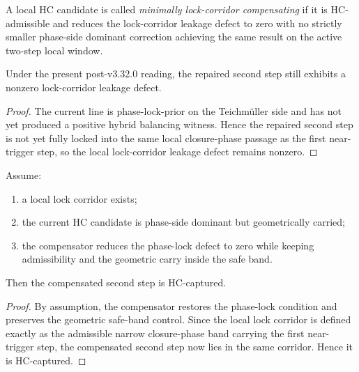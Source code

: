 \begin{definition}
\label{def:minimal-local-lock-corridor-compensation}
A local HC candidate is called \emph{minimally lock-corridor compensating} if it is HC-admissible and reduces the lock-corridor leakage defect to zero with no strictly smaller phase-side dominant correction achieving the same result on the active two-step local window.
\end{definition}

\begin{proposition}
\label{prop:current-line-still-exhibits-lock-corridor-leakage}
Under the present post-v3.32.0 reading, the repaired second step still exhibits a nonzero lock-corridor leakage defect.
\end{proposition}

\begin{proof}
The current line is phase-lock-prior on the Teichm\"uller side and has not yet produced a positive hybrid balancing witness. Hence the repaired second step is not yet fully locked into the same local closure-phase passage as the first near-trigger step, so the local lock-corridor leakage defect remains nonzero.
\end{proof}

\begin{lemma}
\label{lem:phase-side-dominant-hc-yields-lock-corridor-capture}
Assume:
\begin{enumerate}[leftmargin=2em,label=(\alph*)]
  \item a local lock corridor exists;
  \item the current HC candidate is phase-side dominant but geometrically carried;
  \item the compensator reduces the phase-lock defect to zero while keeping admissibility and the geometric carry inside the safe band.
\end{enumerate}
Then the compensated second step is HC-captured.
\end{lemma}

\begin{proof}
By assumption, the compensator restores the phase-lock condition and preserves the geometric safe-band control. Since the local lock corridor is defined exactly as the admissible narrow closure-phase band carrying the first near-trigger step, the compensated second step now lies in the same corridor. Hence it is HC-captured.
\end{proof}

